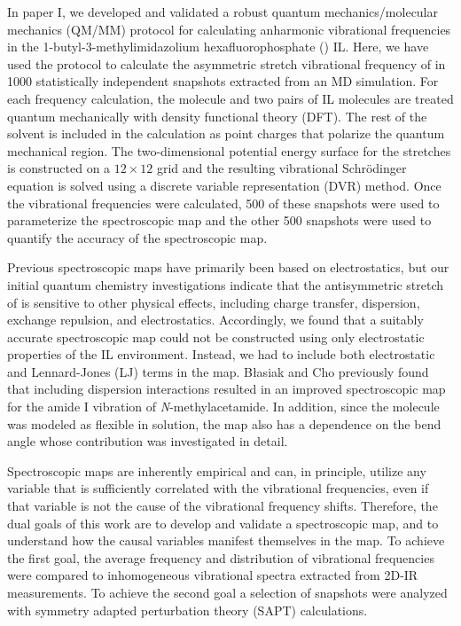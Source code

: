 \documentclass[%
  class = book,%
  crop = false,%
  float = true,%
  multi = true,%
  preview = false,%
]{standalone}
\begin{document}
In paper I\cite{Berquist2017}, we developed and validated a robust quantum mechanics/molecular mechanics (QM/MM) protocol for calculating anharmonic  vibrational frequencies in the 1-butyl-3-methylimidazolium hexafluorophosphate (\ce{[C4C1im][PF6]}) IL. Here, we have used the protocol to calculate the asymmetric stretch vibrational frequency of  in 1000 statistically independent snapshots extracted from an MD simulation. For each frequency calculation, the  molecule and two pairs of IL molecules are treated quantum mechanically with density functional theory (DFT). The rest of the solvent is included in the calculation as point charges that polarize the quantum mechanical region. The two-dimensional potential energy surface for the  stretches is constructed on a \(12 \times 12\) grid and the resulting vibrational Schrödinger equation is solved using a discrete variable representation (DVR) method. Once the vibrational frequencies were calculated, \num{500} of these snapshots were used to parameterize the spectroscopic map and the other \num{500} snapshots were used to quantify the accuracy of the spectroscopic map.

Previous spectroscopic maps have primarily been based on electrostatics,\cite{choi_vibrational_2011,corcelliJCP-04a,ohJCP-08,corcelliJPCA-05,schmidt_pronounced_2005-1,blasiak_vibrational_2013,Basiak2014} but our initial quantum chemistry investigations\cite{Brinzer2015,Berquist2017} indicate that the antisymmetric stretch of  is sensitive to other physical effects, including charge transfer, dispersion, exchange repulsion, and electrostatics. Accordingly, we found that a suitably accurate spectroscopic map could not be constructed using only electrostatic properties of the IL environment. Instead, we had to include both electrostatic and Lennard-Jones (LJ) terms in the map. Błasiak and Cho previously found that including dispersion interactions resulted in an improved spectroscopic map for the amide I vibration of \textit{N}-methylacetamide.\cite{Basiak2015} In addition, since the  molecule was modeled as flexible in solution, the map also has a dependence on the  bend angle whose contribution was investigated in detail.

Spectroscopic maps are inherently empirical and can, in principle, utilize any variable that is sufficiently correlated with the vibrational frequencies, even if that variable is not the cause of the vibrational frequency shifts. Therefore, the dual goals of this work are to develop and validate a spectroscopic map, and to understand how the causal variables manifest themselves in the map. To achieve the first goal, the average frequency and distribution of vibrational frequencies were compared to inhomogeneous vibrational spectra extracted from 2D-IR measurements. To achieve the second goal a selection of snapshots were analyzed with symmetry adapted perturbation theory (SAPT)\cite{Jeziorski1994,Hohenstein2010,Hohenstein2011} calculations.
\end{document}
